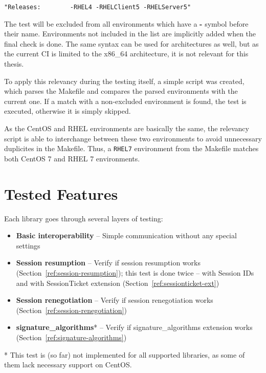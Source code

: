     \begin{lstlisting}
"Releases:        -RHEL4 -RHELClient5 -RHELServer5"
    \end{lstlisting}

    The test will be excluded from all environments which have a \textbf{-} symbol
    before their name. Environments not included in the list are implicitly
    added when the final check is done. The same syntax can be used for
    architectures as well, but as the current CI is limited to the x86\_64
    architecture, it is not relevant for this thesis.

    To apply this relevancy during the testing itself, a simple script was
    created, which parses the Makefile and compares the parsed environments
    with the current one. If a match with a non-excluded environment is found,
    the test is executed, otherwise it is simply skipped.

    As the CentOS and RHEL environments are basically the same, the relevancy
    script is able to interchange between these two environments to avoid
    unnecessary duplicites in the Makefile. Thus, a \texttt{RHEL7} environment
    from the Makefile matches both CentOS 7 and RHEL 7 environments.

\section{Tested Features}
    Each library goes through several layers of testing:

    \begin{itemize}
        \item \textbf{Basic interoperability} -- Simple communication without
            any special settings
        \item \textbf{Session resumption} -- Verify if session resumption works
            (Section~\ref{ref:session-resumption}); this test is done twice --
            with Session IDs and with SessionTicket
            extension (Section~\ref{ref:sessionticket-ext})
        \item \textbf{Session renegotiation} -- Verify if session renegotiation
            works (Section~\ref{ref:session-renegotiation})
        \item \textbf{signature\_algorithms}* -- Verify if signature\_algorithms
            extension works (Section~\ref{ref:signature-algorithms})
    \end{itemize}

    * This test is (so far) not implemented for all supported libraries, as
    some of them lack necessary support on CentOS. \\

